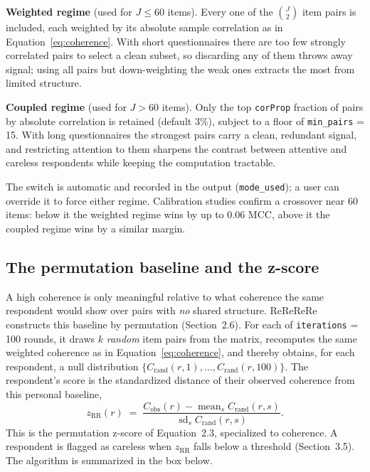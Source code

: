 \documentclass[doc,11pt,donotrepeattitle]{apa7}
\begin{document}
\textbf{Weighted regime} (used for $J \le 60$ items). Every one of the
$\binom{J}{2}$ item pairs is included, each weighted by its absolute sample
correlation as in Equation~\ref{eq:coherence}. With short questionnaires there
are too few strongly correlated pairs to select a clean subset, so discarding
any of them throws away signal; using all pairs but down-weighting the weak ones
extracts the most from limited structure.

\textbf{Coupled regime} (used for $J > 60$ items). Only the top
\texttt{corProp} fraction of pairs by absolute correlation is retained (default
3\%), subject to a floor of \texttt{min\_pairs} = 15. With long questionnaires
the strongest pairs carry a clean, redundant signal, and restricting attention
to them sharpens the contrast between attentive and careless respondents while
keeping the computation tractable.

The switch is automatic and recorded in the output (\texttt{mode\_used}); a user
can override it to force either regime. Calibration studies confirm a crossover
near 60 items: below it the weighted regime wins by up to $0.06$ MCC, above it
the coupled regime wins by a similar margin.

\subsection{The permutation baseline and the z-score}

A high coherence is only meaningful relative to what coherence the same
respondent would show over pairs with \emph{no} shared structure. ReReReRe
constructs this baseline by permutation (Section~2.6). For each of
\texttt{iterations} = 100 rounds, it draws $k$ \emph{random} item pairs from the
matrix, recomputes the same weighted coherence as in
Equation~\ref{eq:coherence}, and thereby obtains, for each respondent, a null
distribution $\{C_{\text{rand}}(r,1), \dots, C_{\text{rand}}(r,100)\}$. The
respondent's score is the standardized distance of their observed coherence from
this personal baseline,
\begin{equation}
z_{\text{RR}}(r) \;=\;
\frac{C_{\text{obs}}(r) - \operatorname{mean}_s C_{\text{rand}}(r,s)}
{\operatorname{sd}_s C_{\text{rand}}(r,s)} .
\label{eq:zrr}
\end{equation}
This is the permutation z-score of Equation~2.3, specialized to coherence.
A respondent is flagged as careless when $z_{\text{RR}}$ falls below a
threshold (Section~3.5). The algorithm is summarized in the box below.
\end{document}

